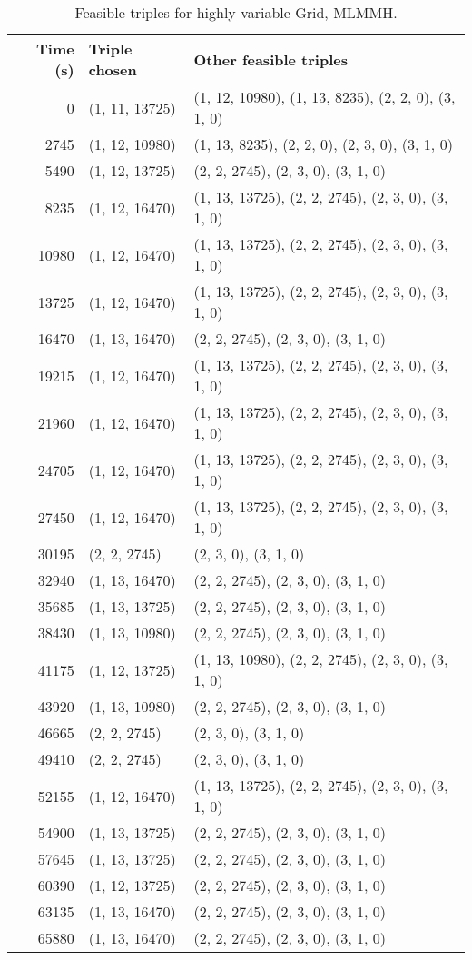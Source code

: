 \begin{table}[H]
\caption{Feasible triples for highly variable Grid, MLMMH.} \label{tbl1}
\begin{tabularx}{6.5 in}{r l X}
\hline {{Time (s)}} & {{Triple chosen}} & {{Other feasible triples}} \\ \hline
0 & (1, 11, 13725) & (1, 12, 10980), (1, 13, 8235), (2, 2, 0), (3, 1, 0) \\
2745 & (1, 12, 10980) & (1, 13, 8235), (2, 2, 0), (2, 3, 0), (3, 1, 0) \\
5490 & (1, 12, 13725) & (2, 2, 2745), (2, 3, 0), (3, 1, 0) \\
8235 & (1, 12, 16470) & (1, 13, 13725), (2, 2, 2745), (2, 3, 0), (3, 1, 0) \\
10980 & (1, 12, 16470) & (1, 13, 13725), (2, 2, 2745), (2, 3, 0), (3, 1, 0) \\
13725 & (1, 12, 16470) & (1, 13, 13725), (2, 2, 2745), (2, 3, 0), (3, 1, 0) \\
16470 & (1, 13, 16470) & (2, 2, 2745), (2, 3, 0), (3, 1, 0) \\
19215 & (1, 12, 16470) & (1, 13, 13725), (2, 2, 2745), (2, 3, 0), (3, 1, 0) \\
21960 & (1, 12, 16470) & (1, 13, 13725), (2, 2, 2745), (2, 3, 0), (3, 1, 0) \\
24705 & (1, 12, 16470) & (1, 13, 13725), (2, 2, 2745), (2, 3, 0), (3, 1, 0) \\
27450 & (1, 12, 16470) & (1, 13, 13725), (2, 2, 2745), (2, 3, 0), (3, 1, 0) \\
30195 & (2, 2, 2745) & (2, 3, 0), (3, 1, 0) \\
32940 & (1, 13, 16470) & (2, 2, 2745), (2, 3, 0), (3, 1, 0) \\
35685 & (1, 13, 13725) & (2, 2, 2745), (2, 3, 0), (3, 1, 0) \\
38430 & (1, 13, 10980) & (2, 2, 2745), (2, 3, 0), (3, 1, 0) \\
41175 & (1, 12, 13725) & (1, 13, 10980), (2, 2, 2745), (2, 3, 0), (3, 1, 0) \\
43920 & (1, 13, 10980) & (2, 2, 2745), (2, 3, 0), (3, 1, 0) \\
46665 & (2, 2, 2745) & (2, 3, 0), (3, 1, 0) \\
49410 & (2, 2, 2745) & (2, 3, 0), (3, 1, 0) \\
52155 & (1, 12, 16470) & (1, 13, 13725), (2, 2, 2745), (2, 3, 0), (3, 1, 0) \\
54900 & (1, 13, 13725) & (2, 2, 2745), (2, 3, 0), (3, 1, 0) \\
57645 & (1, 13, 13725) & (2, 2, 2745), (2, 3, 0), (3, 1, 0) \\
60390 & (1, 12, 13725) & (2, 2, 2745), (2, 3, 0), (3, 1, 0) \\
63135 & (1, 13, 16470) & (2, 2, 2745), (2, 3, 0), (3, 1, 0) \\
65880 & (1, 13, 16470) & (2, 2, 2745), (2, 3, 0), (3, 1, 0) \\


\hline
\end{tabularx}
\end{table}
\clearpage

